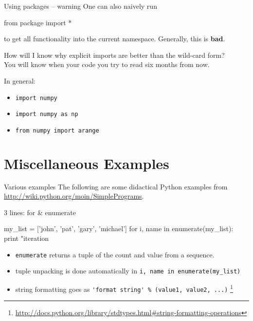\documentclass[xetex,10pt]{beamer}
\def\pythoni{\lstinline[language=pythontim]}
\def\spacer{\vspace*{1em}}
\begin{document}
\begin{frame}[fragile]{Using packages -- warning}
	One can also naively run
	
	\begin{python}
	from package import *
	\end{python}

	to get all functionality into the current namespace. Generally, this is \textbf{bad}.
	\spacer
	\pause
	
	How will I know why explicit imports are better than the wild-card form?\\
	\pause
	You will know when your code you try to read six months from now.\\
	
	\spacer
	\pause

	In general:
	\begin{itemize}
	\item \pythoni{import numpy}
	\item \pythoni{import numpy as np}
	\item \pythoni{from numpy import arange}
	\end{itemize}
	
\end{frame}

\section{Miscellaneous Examples}

\begin{frame}[fragile]{Various examples}
	The following are some didactical Python examples from \url{http://wiki.python.org/moin/SimplePrograms}.
\end{frame}

\begin{frame}[fragile]{3 lines: for \& enumerate}
	\begin{python}
my_list = ['john', 'pat', 'gary', 'michael']
for i, name in enumerate(my_list):
  print "iteration %
	\end{python}
	\spacer
	\pause
	\begin{itemize}
	\item \pythoni{enumerate} returns a tuple of the count and value from a sequence.
	\pause
	\item tuple unpacking is done automatically in \pythoni{i, name in enumerate(my_list)}
	\pause
	\item string formatting goes as \pythoni{'format string' %
	\footnote[frame]{\url{http://docs.python.org/library/stdtypes.html\#string-formatting-operations}}
	\end{itemize}
\end{frame}
\end{document}
